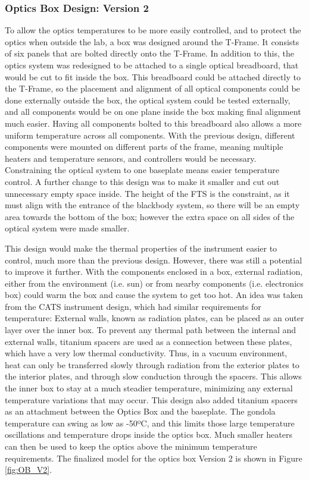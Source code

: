 \subsubsection{Optics Box Design: Version 2}
To allow the optics temperatures to be more easily controlled, and to protect the optics when outside the lab, a box was designed around the T-Frame. It consists of six panels that are bolted directly onto the T-Frame. In addition to this, the optics system was redesigned to be attached to a single optical breadboard, that would be cut to fit inside the box. This breadboard could be attached directly to the T-Frame, so the placement and alignment of all optical components could be done externally outside the box, the optical system could be tested externally, and all components would be on one plane inside the box making final alignment much easier. Having all components bolted to this breadboard also allows a more uniform temperature across all components. With the previous design, different components were mounted on different parts of the frame, meaning multiple heaters and temperature sensors, and controllers would be necessary. Constraining the optical system to one baseplate means easier temperature control. A further change to this design was to make it smaller and cut out unnecessary empty space inside. The height of the FTS is the constraint, as it must align with the entrance of the blackbody system, so there will be an empty area towards the bottom of the box; however the extra space on all sides of the optical system were made smaller. 

This design would make the thermal properties of the instrument easier to control, much more than the previous design. However, there was still a potential to improve it further.  With the components enclosed in a box, external radiation, either from the environment (i.e. sun) or from nearby components (i.e. electronics box) could warm the box and cause the system to get too hot. An idea was taken from the CATS instrument design, which had similar requirements for temperature: External walls, known as radiation plates, can be placed as an outer layer over the inner box. To prevent any thermal path between the internal and external walls, titanium spacers are used as a connection between these plates, which have a very low thermal conductivity. Thus, in a vacuum environment, heat can only be transferred slowly through radiation from the exterior plates to the interior plates, and through slow conduction through the spacers. This allows the inner box to stay at a much steadier temperature, minimizing any external temperature variations that may occur. This design also added titanium spacers as an attachment between the Optics Box and the baseplate. The gondola temperature can swing as low as -50ºC, and this limits those large temperature oscillations and temperature drops inside the optics box. Much smaller heaters can then be used to keep the optics above the minimum temperature requirements. The finalized model for the optics box Version 2 is shown in Figure \ref{fig:OB_V2}.


